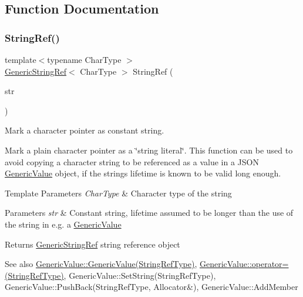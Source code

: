 \subsection{Function Documentation}
\mbox{\label{a00476_aa6b9fd9f6aa49405a574c362ba9af6b5}} 
\subsubsection{\texorpdfstring{String\+Ref()}{StringRef()}\hspace{0.1cm}{\footnotesize\ttfamily [1/2]}}
{\footnotesize\ttfamily template$<$typename Char\+Type $>$ \\
\hyperlink{a02008}{Generic\+String\+Ref}$<$ Char\+Type $>$ String\+Ref (\begin{DoxyParamCaption}\item[{const Char\+Type $\ast$}]{str }\end{DoxyParamCaption})\hspace{0.3cm}{\ttfamily [inline]}}



Mark a character pointer as constant string. 

Mark a plain character pointer as a \char`\"{}string literal\char`\"{}. This function can be used to avoid copying a character string to be referenced as a value in a J\+S\+ON \hyperlink{a01992}{Generic\+Value} object, if the string\textquotesingle{}s lifetime is known to be valid long enough. 
\begin{DoxyTemplParams}{Template Parameters}
{\em Char\+Type} & Character type of the string \\
\hline
\end{DoxyTemplParams}

\begin{DoxyParams}{Parameters}
{\em str} & Constant string, lifetime assumed to be longer than the use of the string in e.\+g. a \hyperlink{a01992}{Generic\+Value} \\
\hline
\end{DoxyParams}
\begin{DoxyReturn}{Returns}
\hyperlink{a02008}{Generic\+String\+Ref} string reference object
\end{DoxyReturn}
\begin{DoxySeeAlso}{See also}
\hyperlink{a01992_abb2887958974fef1b2b5c8e32cc72ddb}{Generic\+Value\+::\+Generic\+Value(\+String\+Ref\+Type)}, \hyperlink{a01992_a386708557555e6389184de608af5e6a6}{Generic\+Value\+::operator=(\+String\+Ref\+Type)}, Generic\+Value\+::\+Set\+String(\+String\+Ref\+Type), Generic\+Value\+::\+Push\+Back(\+String\+Ref\+Type, Allocator\&), Generic\+Value\+::\+Add\+Member 
\end{DoxySeeAlso}
\mbox{\label{a00476_a578c51ab574a50a9c760b9da7c7562f2}} 
